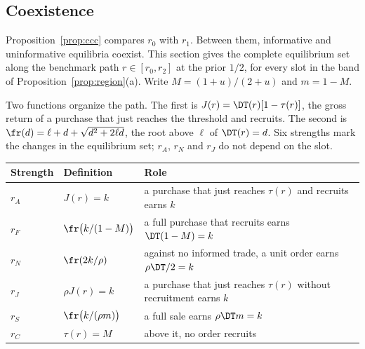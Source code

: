 \subsection{Coexistence}\label{sec:coexistence}

Proposition~\ref{prop:ccc} compares \(r_0\) with \(r_1\). Between them, informative and uninformative equilibria
coexist. This section gives the complete equilibrium set along the benchmark path \(r\in[r_0,r_2]\) at the prior
\(1/2\), for every slot in the band of Proposition~\ref{prop:region}(a). Write \(M=(1+u)/(2+u)\) and \(m=1-M\).

Two functions organize the path. The first is \(J(r)=\DT(r)[1-\tau(r)]\), the gross return of a purchase that just
reaches the threshold and recruits. The second is \(\fr(d)=\ell+d+\sqrt{d^2+2\ell d}\), the root above \(\ell\) of
\(\DT(r)=d\). Six strengths mark the changes in the equilibrium set; \(r_A\), \(r_N\) and \(r_J\) do not depend on
the slot.
\begin{center}\small\singlespacing
\begin{tabular}{@{}lll@{}}
\toprule
Strength & Definition & Role\\
\midrule
\(r_A\) & \(J(r)=k\) & a purchase that just reaches \(\tau(r)\) and recruits earns \(k\)\\
\(r_F\) & \(\fr\bigl(k/(1-M)\bigr)\) & a full purchase that recruits earns \(\DT(1-M)=k\)\\
\(r_N\) & \(\fr(2k/\rho)\) & against no informed trade, a unit order earns \(\rho\DT/2=k\)\\
\(r_J\) & \(\rho J(r)=k\) & a purchase that just reaches \(\tau(r)\) without recruitment earns \(k\)\\
\(r_S\) & \(\fr\bigl(k/(\rho m)\bigr)\) & a full sale earns \(\rho\DT m=k\)\\
\(r_C\) & \(\tau(r)=M\) & above it, no order recruits\\
\bottomrule
\end{tabular}
\end{center}

